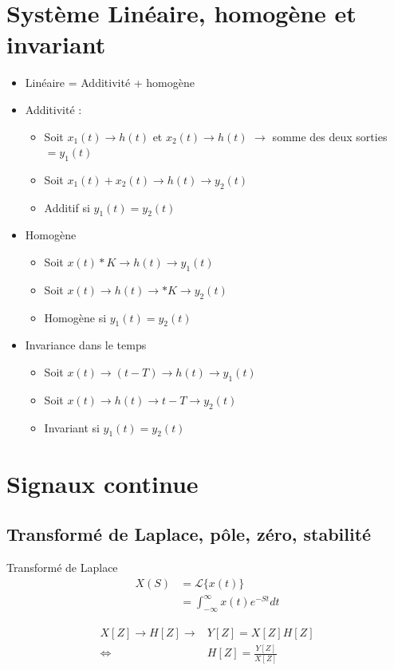 \documentclass{article}
\theoremstyle{plain}%
\theoremstyle{definition}
\theoremstyle{remark}
\begin{document}
\section{Système Linéaire, homogène et invariant}
\begin{itemize}
    \item Linéaire = Additivité + homogène 
    \item Additivité : \begin{itemize}
        \item Soit $ x_1(t) \to h(t) $ et $ x_2(t) \to h(t) $ $\rightarrow$ somme des deux sorties $ = y_1(t) $
        \item Soit $ x_1(t)+x_2(t) \to h(t) \to y_2(t) $
        \item Additif si $ y_1(t) = y_2(t) $  
    \end{itemize} 
    \item Homogène \begin{itemize}
        \item Soit $ x(t)*K \to h(t) \to y_1(t)$ 
        \item Soit $ x(t) \to h(t) \to *K \to y_2(t)$
        \item Homogène si $ y_1(t) = y_2(t) $
    \end{itemize}
    \item Invariance dans le temps \begin{itemize}
        \item Soit $ x(t) \to (t-T) \to h(t) \to y_1(t) $ 
        \item Soit $ x(t) \to h(t) \to t-T \to y_2(t) $ 
        \item Invariant si $ y_1(t) = y_2(t) $
    \end{itemize}
\end{itemize}

\section{Signaux continue}
\subsection{Transformé de Laplace, pôle, zéro, stabilité}
Transformé de Laplace
\begin{align*}
    X(S) &= \mathcal{L}\{x(t)\} \\
        &= \int_{-\infty }^{\infty }x(t)e^{-St}dt
\end{align*}

\begin{align*}
    X[Z] \to H[Z] \to &Y[Z] = X[Z]H[Z] \\
    \Leftrightarrow & H[Z] = \frac{Y[Z]}{X[Z]}
\end{align*}
\end{document}
